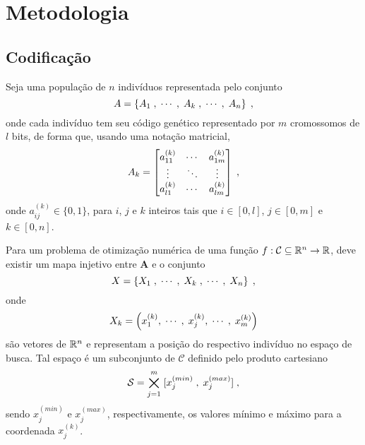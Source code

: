 \chapter{Metodologia}\label{cap_metodologia}

\section{Codificação}

\newcommand{\kth}[2]{{#1}^{(k)}_{#2}}
\newcommand{\kpth}[2]{{#1}^{(k + 1)}_{#2}}
\newcommand{\xmin}[1]{x^{(min)}_{#1}}
\newcommand{\xmax}[1]{x^{(max)}_{#1}}

Seja uma população de $n$ indivíduos representada pelo conjunto
\begin{equation}
  A = \left\{ A_1\;, \;\cdots\;,  \;A_k\;, \;\cdots\;, \;A_n \right\} \;\mathrm{,}
\end{equation}
onde cada indivíduo tem seu código genético representado por $m$ cromossomos
de $l$ bits, de forma que, usando uma notação matricial,
\begin{equation}
  A_k = \left[
    \begin{matrix}
      \kth{a}{11} & \cdots & \kth{a}{1m} \\
      \vdots      & \ddots & \vdots      \\
      \kth{a}{l1} & \cdots & \kth{a}{lm} \\
    \end{matrix}
    \right]
  \mathcomma
\end{equation}
onde $ \kth{a}{ij} \in \{0,1\} $, para $i$, $j$ e $k$ inteiros tais que
$ i \in \left[ 0, l \right] $, $ j \in \left[ 0, m \right] $ e $ k \in \left[ 0, n \right] $.

Para um problema de otimização numérica de uma função $ f : \mathcal{C} \subseteq \mathbb{R}^n \rightarrow \mathbb{R} $,
deve existir um mapa injetivo entre $ \mathbf{A} $ e o conjunto
\begin{equation}
  X = \left\{ X_1 \; , \;\cdots\;,  \; X_k \; , \;\cdots\;, \; X_n \right\} \;\mathrm{,}
\end{equation}
onde
\begin{equation}
  X_k = \left( \kth{x}{1}, \mathdots, \; \kth{x}{j}, \mathdots, \; \kth{x}{m} \right)
\end{equation}
são vetores de $ \mathbb{R}^n $ e representam a posição do respectivo indivíduo no espaço de busca.
Tal espaço é um subconjunto de $ \mathcal{C} $ definido pelo produto cartesiano
\begin{equation}
  \mathcal{S} = \bigtimes_{j = 1}^m \; [ \xmin{j} \; , \; \xmax{j} ] \mathcomma
\end{equation}
sendo $ \xmin{j} $ e $ \xmax{j} $, respectivamente, os valores mínimo e máximo para
a coordenada $ \kth{x}{j} $.

